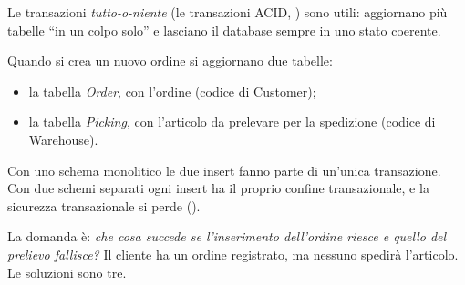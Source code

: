 Le transazioni \emph{tutto-o-niente} (le transazioni ACID, ) sono utili: aggiornano più tabelle
``in un colpo solo'' e lasciano il database sempre in uno stato coerente.

\begin{esempio}
Quando si crea un nuovo ordine si aggiornano due tabelle:
\begin{itemize}
  \item la tabella \emph{Order}, con l'ordine (codice di Customer);
  \item la tabella \emph{Picking}, con l'articolo da prelevare per la spedizione (codice di Warehouse).
\end{itemize}
Con uno schema monolitico le due insert fanno parte di un'unica transazione. Con due schemi separati ogni insert ha il
proprio confine transazionale, e la sicurezza transazionale si perde ().
\end{esempio}

La domanda è: \emph{che cosa succede se l'inserimento dell'ordine riesce e quello del prelievo fallisce?} Il cliente ha
un ordine registrato, ma nessuno spedirà l'articolo. Le soluzioni sono tre.

